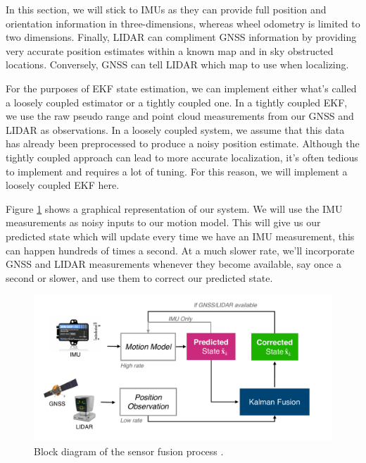 In this section, we will stick to IMUs as they can provide full position
and orientation information in three-dimensions, whereas wheel odometry is limited to two dimensions. Finally, LIDAR
can compliment GNSS information by providing very accurate position estimates within a known map and in sky obstructed locations. 
Conversely, GNSS can tell LIDAR which map to use when localizing. 




For the purposes of EKF state estimation, we can implement either what's called a loosely coupled estimator or a
tightly coupled one. In a tightly coupled EKF, we use the raw pseudo range and point cloud measurements from our GNSS and LIDAR
as observations. In a loosely coupled system, we assume that this data has already been preprocessed to produce a noisy
position estimate. Although the tightly coupled approach can lead to more accurate localization, it's often tedious
to implement and requires a lot of tuning. For this reason, we will implement a loosely coupled EKF here. 

Figure \ref{ekf_sensor_fusion} shows a graphical representation
of our system. We will use the IMU measurements as noisy inputs to
our motion model. This will give us our predicted state which will update every time we have an IMU measurement, this can happen hundreds
of times a second. At a much slower rate, we'll incorporate GNSS and LIDAR measurements whenever they become available, say once a second
or slower, and use them to correct our predicted state. 

\begin{figure}[!htb]
\begin{center}
\includegraphics[scale=0.280]{img/sensor_fusion/ekf_sensor_fusion.jpeg}
\end{center}
\caption{Block diagram of the sensor fusion process .}
\label{ekf_sensor_fusion}
\end{figure}

